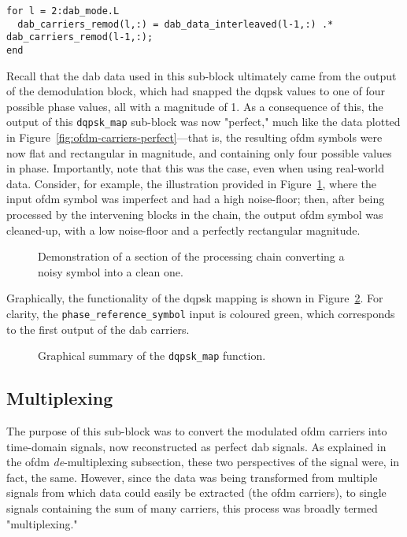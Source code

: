 \documentclass[class=report,11pt,crop=false]{standalone}
\begin{document}
\begin{lstlisting}[caption={\textsc{Matlab} code for the actual \texttt{dqpsk\_map} functionality of differential modulation.},label={code:dqpsk_map-2}]
for l = 2:dab_mode.L
  dab_carriers_remod(l,:) = dab_data_interleaved(l-1,:) .* dab_carriers_remod(l-1,:);
end
\end{lstlisting}

Recall that the \gls{dab} data used in this sub-block ultimately came from the output of the demodulation block, which had snapped the \gls{dqpsk} values to one of four possible phase values, all with a magnitude of 1. As a consequence of this, the output of this \texttt{dqpsk\_map} sub-block was now "perfect," much like the data plotted in Figure~\ref{fig:ofdm-carriers-perfect}---that is, the resulting \gls{ofdm} symbols were now flat and rectangular in magnitude, and containing only four possible values in phase. Importantly, note that this was the case, even when using real-world data. Consider, for example, the illustration provided in Figure~\ref{fig:dqpsk_map-demo}, where the input \gls{ofdm} symbol was imperfect and had a high noise-floor; then, after being processed by the intervening blocks in the chain, the output \gls{ofdm} symbol was cleaned-up, with a low noise-floor and a perfectly rectangular magnitude.

\begin{figure}[htbp]
  \centering
  \captionsetup{type=figure}
  \def\svgwidth{\linewidth}
  { %
    }
  \caption{Demonstration of a section of the processing chain converting a noisy  symbol into a clean one.}
  \label{fig:dqpsk_map-demo}
\end{figure}

Graphically, the functionality of the \gls{dqpsk} mapping is shown in Figure~\ref{fig:dqpsk_map}. For clarity, the \texttt{phase\_reference\_symbol} input is coloured green, which corresponds to the first output of the \gls{dab} carriers.

\begin{figure}[htbp]
  \centering
  \captionsetup{type=figure}
  \def\svgwidth{\linewidth}
  { %
  }
  \caption{Graphical summary of the \texttt{dqpsk\_map} function.}
  \label{fig:dqpsk_map}
\end{figure}

\subsection{ Multiplexing \label{subsect:dab-proc_ofdm-mux}}
The purpose of this sub-block was to convert the modulated \gls{ofdm} carriers into time-domain signals, now reconstructed as perfect \gls{dab} signals. As explained in the \gls{ofdm} \emph{de}-multiplexing subsection, these two perspectives of the signal were, in fact, the same. However, since the data was being transformed from multiple signals from which data could easily be extracted (the \gls{ofdm} carriers), to single signals containing the sum of many carriers, this process was broadly termed "multiplexing."
\end{document}

